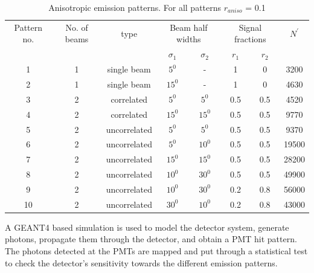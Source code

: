 \begin{table}[h]
  \centering
  \caption{Anisotropic emission patterns. For all patterns $r_{aniso}$ = 0.1}
  \label{tab:AnisoPattern}
  \begin{tabular}{|c |c |c|cc|cc|c|}
  \hline
  Pattern no. & No. of beams & type & \multicolumn{2}{c|}{Beam half widths}& \multicolumn{2}{c|}{Signal fractions} & $N^{'}$ \\
  &              &      &  $\sigma_1$ & $\sigma_2$   &  $r_1$ & $r_2$ &   \\
  \hline
  1 & 1 & single beam & $5^{0}$ & - & 1 & 0 & 3200\\
   2 & 1 & single beam & $15^{0}$ & - & 1 & 0 & 4630\\
   3 & 2 & correlated & $5^{0}$ & $5^{0}$ & 0.5 & 0.5 &  4520  \\
   4 & 2 & correlated & $15^{0}$ & $15^{0}$ & 0.5 & 0.5 & 9770  \\
   5 & 2 & uncorrelated & $5^{0}$ & $5^{0}$ & 0.5 & 0.5 & 9370\\
   6 & 2 & uncorrelated & $5^{0}$ & $10^{0}$ & 0.5 & 0.5 & 19500\\
   7 & 2 & uncorrelated & $15^{0}$ & $15^{0}$ & 0.5 & 0.5 & 28200\\
   8 & 2 & uncorrelated & $10^{0}$ & $30^{0}$ & 0.5 & 0.5 & 49900\\
   9 & 2 & uncorrelated & $10^{0}$ & $30^{0}$ & 0.2 & 0.8 & 56000\\
    10 & 2 & uncorrelated & $30^{0}$ & $10^{0}$ & 0.2 & 0.8 & 43000\\
  \hline
 \end{tabular}
\end{table} 
 
 

A GEANT4 based simulation is used to model the detector system, generate photons, propagate them through the detector, and obtain a PMT hit pattern. The photons detected at the 
PMTs are mapped and put through a statistical test to check the detector's sensitivity towards the different emission patterns.

